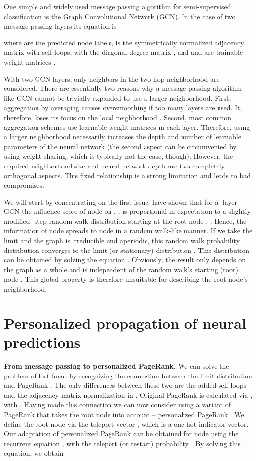 \documentclass{article} \usepackage{iclr2019_conference,times}
\begin{document}
One simple and widely used message passing algorithm for semi-supervised classification is the Graph Convolutional Network (GCN). In the case of two message passing layers its equation is

where  are the predicted node labels,  is the symmetrically normalized adjacency matrix with self-loops, with the diagonal degree matrix , and  and  are trainable weight matrices \citep{kipf_semi-supervised_2017}.

With two GCN-layers, only neighbors in the two-hop neighborhood are considered. There are essentially two reasons why a message passing algorithm like GCN cannot be trivially expanded to use a larger neighborhood. First, aggregation by averaging causes oversmoothing if too many layers are used. It, therefore, loses its focus on the local neighborhood \citep{li_deeper_2018}. Second, most common aggregation schemes use learnable weight matrices in each layer. Therefore, using a larger neighborhood necessarily increases the depth and number of learnable parameters of the neural network (the second aspect can be circumvented by using weight sharing, which is typically not the case, though). However, the required neighborhood size and neural network depth are two completely orthogonal aspects. This fixed relationship is a strong limitation and leads to bad compromises.

We will start by concentrating on the first issue. \citet{xu_representation_2018} have shown that for a -layer GCN the influence score of node  on , , is proportional in expectation to a slightly modified -step random walk distribution starting at the root node , . Hence, the information of node  spreads to node  in a random walk-like manner.
If we take the limit  and the graph is irreducible and aperiodic, this random walk probability distribution  converges to the limit (or stationary) distribution \linebreak . This distribution can be obtained by solving the equation . Obviously, the result only depends on the graph as a whole and is independent of the random walk's starting (root) node . This global property is therefore unsuitable for describing the root node's neighborhood.

\section{Personalized propagation of neural predictions} \label{sec:ppnp}

\textbf{From message passing to personalized PageRank.} We can solve the problem of lost focus by recognizing the connection between the limit distribution and PageRank \citep{page_pagerank_1998}. The only differences between these two are the added self-loops and the adjacency matrix normalization in . Original PageRank is calculated via , with . Having made this connection we can now consider using a variant of PageRank that takes the root node into account -- personalized PageRank \citep{page_pagerank_1998}.
We define the root node  via the teleport vector , which is a one-hot indicator vector. Our adaptation of personalized PageRank can be obtained for node  using the recurrent equation , with the teleport (or restart) probability . By solving this equation, we obtain
\end{document}
